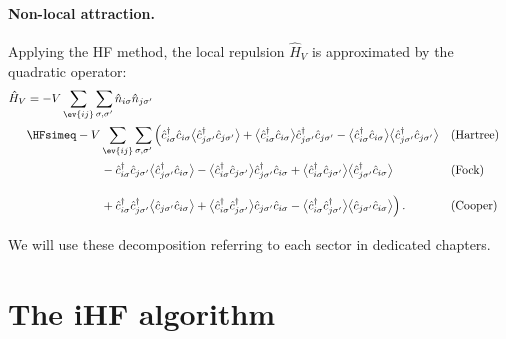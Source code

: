 \paragraph{Non-local attraction.} Applying the HF method, the local repulsion $\hat H_V$ is approximated by the quadratic operator:
\begin{align}
	\hat H_V &= -V \sum_{\ev{ij}} \sum_{\sigma,\sigma'} \hat n_{i\sigma} \hat n_{j\sigma'} \label{eq:mft-HV} \\
	&\HFsimeq -V \sum_{\ev{ij}} \sum_{\sigma,\sigma'} \Big(
	\hat c_{i\sigma}^\dagger \hat c_{i\sigma} \big\langle \hat c_{j\sigma'}^\dagger \hat c_{j\sigma'} \big\rangle + \big\langle \hat c_{i\sigma}^\dagger \hat c_{i\sigma} \big\rangle \hat c_{j\sigma'}^\dagger \hat c_{j\sigma'} - \big\langle \hat c_{i\sigma}^\dagger \hat c_{i\sigma} \big\rangle  \big\langle \hat c_{j\sigma'}^\dagger \hat c_{j\sigma'} \big\rangle &&(\text{Hartree}) \nonumber\\
	&\phantom{\simeq \sum_{{i\sigma}\neq{j\sigma'}} V_{{i\sigma}{j\sigma'}}}
	- \hat c_{i\sigma}^\dagger \hat c_{j\sigma'} \big\langle \hat c_{j\sigma'}^\dagger \hat c_{i\sigma} \big\rangle - \big\langle \hat c_{i\sigma}^\dagger \hat c_{j\sigma'} \big\rangle \hat c_{j\sigma'}^\dagger \hat c_{i\sigma} + \big\langle \hat c_{i\sigma}^\dagger \hat c_{j\sigma'} \big\rangle  \big\langle \hat c_{j\sigma'}^\dagger \hat c_{i\sigma} \big\rangle &&(\text{Fock}) \nonumber\\
	&\phantom{\simeq \sum_{{i\sigma}\neq{j\sigma'}} V_{{i\sigma}{j\sigma'}}}
	+ \hat c_{i\sigma}^\dagger \hat c_{j\sigma'}^\dagger \big\langle \hat c_{j\sigma'} \hat c_{i\sigma} \big\rangle + \big\langle \hat c_{i\sigma}^\dagger \hat c_{j\sigma'}^\dagger \big\rangle \hat c_{j\sigma'} \hat c_{i\sigma} - \big\langle \hat c_{i\sigma}^\dagger \hat c_{j\sigma'}^\dagger \big\rangle  \big\langle \hat c_{j\sigma'} \hat c_{i\sigma} \big\rangle
	\Big) \, . &&(\text{Cooper}) \nonumber
\end{align}
We will use these decomposition referring to each sector in dedicated chapters.

\section{The iHF algorithm}\label{sec:sketch-ihf-algorithm}

